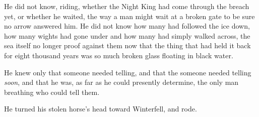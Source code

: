 He did not know, riding, whether the Night King had come through the breach yet, or whether he waited, the way a man might wait at a broken gate to be sure no arrow answered him. He did not know how many had followed the ice down, how many wights had gone under and how many had simply walked across, the sea itself no longer proof against them now that the thing that had held it back for eight thousand years was so much broken glass floating in black water.

He knew only that someone needed telling, and that the someone needed telling \textit{soon}, and that he was, as far as he could presently determine, the only man breathing who could tell them.

He turned his stolen horse’s head toward Winterfell, and rode.
